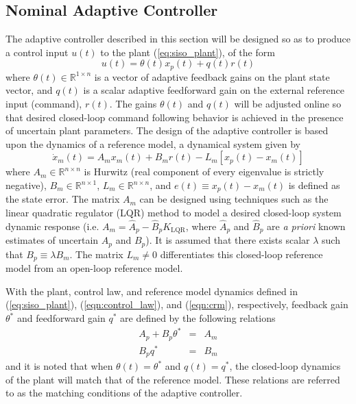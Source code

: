 \subsection{Nominal Adaptive Controller}
The adaptive controller described in this section will be designed so as to produce a control input $u(t)$ to the plant (\ref{eq:siso_plant}), of the form
\begin{equation}
	u(t) = \theta(t) x_p(t) + q(t) r(t)
	\label{eqn:control_law}
\end{equation}
\noindent where $\theta(t) \in \mathbb{R}^{1 \times n}$ is a vector of adaptive feedback gains on the plant state vector, and $q(t)$ is a scalar adaptive feedforward gain on the external reference input (command), $r(t)$. The gains $\theta(t)$ and $q(t)$ will be adjusted online so that desired closed-loop command following behavior is achieved in the presence of uncertain plant parameters. The design of the adaptive controller is based upon the dynamics of a reference model, a dynamical system given by
\begin{equation}
	\dot{x}_m(t) = A_m x_m(t) + B_m r(t) - L_m \left[x_p(t) - x_m(t)\right]
	\label{eqn:crm}
\end{equation}
\noindent where $A_m \in \mathbb{R}^{n \times n}$ is Hurwitz (real component of every eigenvalue is strictly negative), $B_m \in \mathbb{R}^{n \times 1}$, $L_m \in \mathbb{R}^{n \times n}$, and $e(t) \equiv x_p(t) - x_m(t)$ is defined as the state error. The matrix $A_m$ can be designed using techniques such as the linear quadratic regulator (LQR) method to model a desired closed-loop system dynamic response (i.e. $A_m = \hat{A}_p - \hat{B}_p K_{\textrm{LQR}}$, where $\hat{A}_p$ and $\hat{B}_p$ are \textit{a priori} known estimates of uncertain $A_p$ and $B_p$). It is assumed that there exists scalar $\lambda$ such that $B_p \equiv \lambda B_m$. The matrix $L_m \neq 0$ differentiates this closed-loop reference model from an open-loop reference model. 

With the plant, control law, and reference model dynamics defined in (\ref{eq:siso_plant}), (\ref{eqn:control_law}), and (\ref{eqn:crm}), respectively, feedback gain $\theta^*$ and feedforward gain $q^*$ are defined by the following relations
\begin{eqnarray}
	A_p + B_p \theta^* &=& A_m \label{eqn:matchcond1} \\
	B_p q^* &=& B_m \label{eqn:matchcond2} 
\end{eqnarray}
and it is noted that when $\theta(t) = \theta^*$ and $q(t) = q^*$, the closed-loop dynamics of the plant will match that of the reference model. These relations are referred to as the matching conditions of the adaptive controller.

